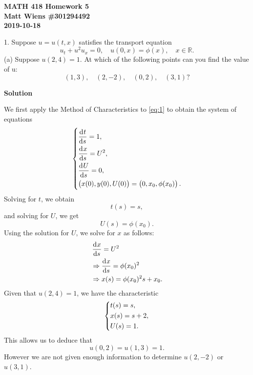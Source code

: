 \documentclass{article}
\begin{document}
\textbf{MATH 418 Homework 5} \\
\textbf{Matt Wiens \#301294492} \\
\textbf{2019-10-18}

1. Suppose $u = u(t, x)$ satisfies the transport equation
%
\begin{equation}
    u_t + u^2 u_x = 0, \quad u(0, x) = \phi(x), \quad x \in \mathbb{R}
    .
    \label{eq:1}
\end{equation}
%
(a) Suppose $u(2, 4) = 1$. At which of the following points can you
find the value of u:
%
\begin{equation*}
    (1, 3), \quad (2, -2), \quad (0, 2), \quad (3, 1)
    ?
\end{equation*}

\textbf{Solution}

We first apply the Method of Characteristics to \eqref{eq:1} to obtain
the system of equations
%
\begin{equation*}
    \begin{dcases}
        \dod{t}{s}= 1, \\
        \dod{x}{s} = U^2, \\
        \dod{U}{s} = 0, \\
        \del{x(0), y(0), U(0)} = \del{0, x_0, \phi(x_0)}
        .
    \end{dcases}
\end{equation*}
%
Solving for $t$, we obtain
%
\begin{equation*}
    t(s) = s
    ,
\end{equation*}
%
and solving for $U$, we get
%
\begin{equation*}
    U(s) = \phi(x_0)
    .
\end{equation*}
%
Using the solution for $U$, we solve for $x$ as follows:
%
\begin{align*}
    &\dod{x}{s} = U^2 \\
    &\Rightarrow \dod{x}{s} = \phi(x_0)^2 \\
    &\Rightarrow x(s) = \phi(x_0)^2 s + x_0
    .
\end{align*}
%
Given that $u(2, 4) = 1$, we have the characteristic
%
\begin{equation*}
    \begin{dcases}
        t(s) = s, \\
        x(s) = s + 2, \\
        U(s) = 1
        .
    \end{dcases}
\end{equation*}
%
This allows us to deduce that \[u(0, 2) = u(1, 3) = 1.\] However we are
not given enough information to determine $u(2, -2)$ or $u(3, 1)$.
\end{document}
